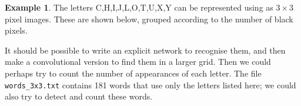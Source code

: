 \documentclass{amsart}
\newcommand{\fr}[4]{\fill (#1,#2) rectangle (#3,#4);}
\newcommand{\gr}[1]{\foreach \i in {0,1,...,#1} {\draw(\i,0) -- (\i,#1); \draw(0,\i) -- (#1,\i);}}
\renewcommand{\:}{\colon}
\theoremstyle{definition}
\newtheorem{example}[theorem]{Example}
\begin{document}
\begin{example}\label{eg-letters}
 The letters C,H,I,J,L,O,T,U,X,Y can be represented using as $3\times 3$
 pixel images.  These are shown below, grouped according to the number of 
 black pixels. 
 \begin{center}
 \end{center}
 It should be possible to write an explicit network to
 recognise them, and then make a convolutional version to find them in
 a larger grid.  Then we could perhaps try to count the number of
 appearances of each letter.  The file \verb+words_3x3.txt+ contains 
 181 words that use only the letters listed here; we could also try to
 detect and count these words.
\end{example}
\end{document}
